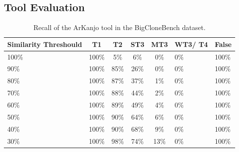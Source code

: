 \documentclass[conference]{IEEEtran}
\begin{document}
\subsection{Tool Evaluation}

\begin{table}[ht]

\centering
\caption{Recall of the ArKanjo tool in the BigCloneBench dataset.}
\renewcommand{\arraystretch}{1.3}
\begin{tabular}{ | m{13mm} | c | c | c | c | m{6mm} | m{6mm} | }

\hline

\textbf{Similarity Threshould} & \textbf{T1} & \textbf{T2} & ST3 & MT3
& WT3/ T4 & \textbf{False} \\ \hline

100\% & 100\% & 5\% & 6\% & 0\% & 0\% & 100\% \\ \hline
90\% & 100\% & 85\% & 26\% & 0\% & 0\% & 100\% \\ \hline
80\% & 100\% & 87\% & 37\% & 1\% & 0\% & 100\% \\ \hline
70\% & 100\% & 88\% & 44\% & 2\% & 0\% & 100\% \\ \hline
60\% & 100\% & 89\% & 49\% & 4\% & 0\% & 100\% \\ \hline
50\% & 100\% & 90\% & 64\% & 6\% & 0\% & 100\% \\ \hline
40\% & 100\% & 90\% & 68\% & 9\% & 0\% & 100\% \\ \hline
30\% & 100\% & 98\% & 74\% & 13\% & 0\% & 100\% \\ \hline

\hline
\end{tabular}

\label{tab:bigclone}
\end{table}
\end{document}
